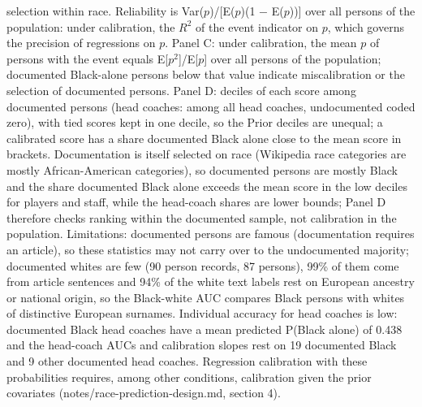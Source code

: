 {selection within race. Reliability is Var($p$)/[E($p$)(1 $-$ E($p$))] over all persons of the population: under calibration, the $R^2$ of the event indicator on $p$, which governs the precision of regressions on $p$. Panel C: under calibration, the mean $p$ of persons with the event equals E[$p^2$]/E[$p$] over all persons of the population; documented Black-alone persons below that value indicate miscalibration or the selection of documented persons. Panel D: deciles of each score among documented persons (head coaches: among all head coaches, undocumented coded zero), with tied scores kept in one decile, so the Prior deciles are unequal; a calibrated score has a share documented Black alone close to the mean score in brackets. Documentation is itself selected on race (Wikipedia race categories are mostly African-American categories), so documented persons are mostly Black and the share documented Black alone exceeds the mean score in the low deciles for players and staff, while the head-coach shares are lower bounds; Panel D therefore checks ranking within the documented sample, not calibration in the population. Limitations: documented persons are famous (documentation requires an article), so these statistics may not carry over to the undocumented majority; documented whites are few (90 person records, 87 persons), 99\% of them come from article sentences and 94\% of the white text labels rest on European ancestry or national origin, so the Black-white AUC compares Black persons with whites of distinctive European surnames. Individual accuracy for head coaches is low: documented Black head coaches have a mean predicted P(Black alone) of 0.438 and the head-coach AUCs and calibration slopes rest on 19 documented Black and 9 other documented head coaches. Regression calibration with these probabilities requires, among other conditions, calibration given the prior covariates (notes/race-prediction-design.md, section 4).
\par}

